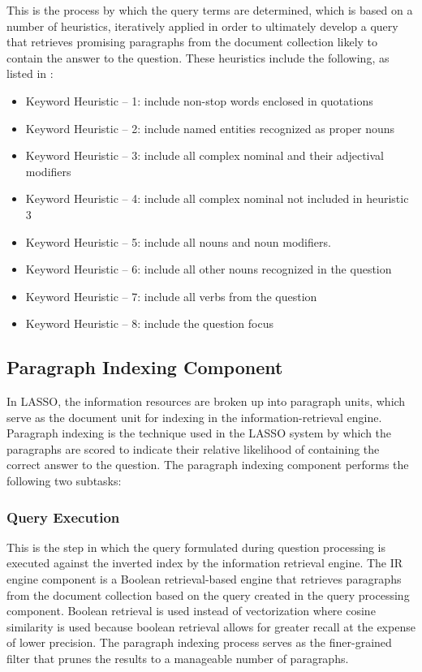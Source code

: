 This is the process by which the query terms are determined, which is based on a number of heuristics, iteratively applied in order to ultimately develop a query that retrieves promising paragraphs from the document collection likely to contain the answer to the question.  These heuristics include the following, as listed in \cite{moldovan_1999}:

\begin{itemize}
\item Keyword Heuristic – 1: include non-stop words enclosed in quotations 
\item Keyword Heuristic – 2: include named entities recognized as proper nouns 
\item Keyword Heuristic – 3: include all complex nominal and their adjectival modifiers
\item Keyword Heuristic – 4: include all complex nominal not included in heuristic 3 
\item Keyword Heuristic – 5: include all nouns and noun modifiers.
\item Keyword Heuristic – 6: include all other nouns recognized in the question 
\item Keyword Heuristic – 7: include all verbs from the question
\item Keyword Heuristic – 8: include the question focus 
\end{itemize}

\subsection{Paragraph Indexing Component}

In LASSO, the information resources are broken up into paragraph units, which serve as the document unit for indexing in the information-retrieval engine.  Paragraph indexing is the technique used in the LASSO system by which the paragraphs are scored to indicate their relative likelihood of containing the correct answer to the question.  The paragraph indexing component performs the following two subtasks:

\subsubsection{Query Execution}

This is the step in which the query formulated during question processing is executed against the inverted index by the information retrieval engine.  The IR engine component is a Boolean retrieval-based engine that retrieves paragraphs from the document collection based on the query created in the query processing component.  Boolean retrieval is used instead of vectorization where cosine similarity is used because boolean retrieval allows for greater recall at the expense of lower precision.  The paragraph indexing process serves as the finer-grained filter that prunes the results to a manageable number of paragraphs.

